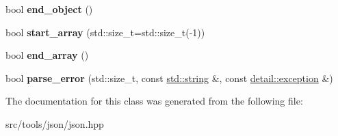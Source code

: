 \begin{DoxyCompactItemize}
\item 
\mbox{\label{classnlohmann_1_1detail_1_1json__sax__acceptor_a919645fd1827a561a994d70a435e3f19}} 
bool {\bfseries end\+\_\+object} ()
\item 
\mbox{\label{classnlohmann_1_1detail_1_1json__sax__acceptor_a8238e8090cbb4ed8a22cbc97bfb833a5}} 
bool {\bfseries start\+\_\+array} (std\+::size\+\_\+t=std\+::size\+\_\+t(-\/1))
\item 
\mbox{\label{classnlohmann_1_1detail_1_1json__sax__acceptor_a22ef94ca5476a9563dcaca15b7d6e654}} 
bool {\bfseries end\+\_\+array} ()
\item 
\mbox{\label{classnlohmann_1_1detail_1_1json__sax__acceptor_a95bb3e8b6feaa523ecda8106fb5e38e3}} 
bool {\bfseries parse\+\_\+error} (std\+::size\+\_\+t, const \hyperlink{namespacenlohmann_1_1detail_a1ed8fc6239da25abcaf681d30ace4985ab45cffe084dd3d20d928bee85e7b0f21}{std\+::string} \&, const \hyperlink{classnlohmann_1_1detail_1_1exception}{detail\+::exception} \&)
\end{DoxyCompactItemize}


The documentation for this class was generated from the following file\+:\begin{DoxyCompactItemize}
\item 
src/tools/json/json.\+hpp\end{DoxyCompactItemize}
